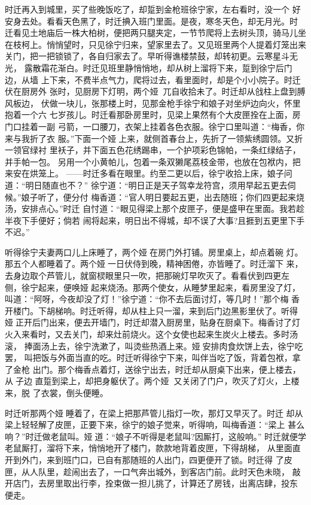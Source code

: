 时迁再入到城里，买了些晚饭吃了，却踅到金枪班徐宁家，左右看时，没一个
好安身去处。看看天色黑了，时迁捵入班门里面。是夜，寒冬天色，却无月光。时
迁看见土地庙后一株大柏树，便把两只腿夹定，一节节爬将上去树头顶，骑马儿坐
在枝柯上。悄悄望时，只见徐宁归来，望家里去了。又见班里两个人提着灯笼出来
关门，把一把锁锁了，各自归家去了。早听得谯楼禁鼓，却转初更。云寒星斗无光，
露散霜花渐白。时迁见班里静悄悄地，却从树上溜将下来，踅到徐宁后门边，从墙
上下来，不费半点气力，爬将过去，看里面时，却是个小小院子。时迁伏在厨房外
张时，见厨房下灯明，两个娅，兀自收拾未了。时迁却从戗柱上盘到膊风板边，
伏做一块儿，张那楼上时，见那金枪手徐宁和娘子对坐炉边向火，怀里抱着一个六
七岁孩儿。时迁看那卧房里时，见梁上果然有个大皮匣拴在上面，房门口挂着一副
弓箭，一口腰刀，衣架上挂着各色衣服。徐宁口里叫道：“梅香，你来与我折了衣
服。”下面一个娅上来，就侧首春台上，先折了一领紫绣圆领。又折一领官绿衬
里袄子，并下面五色花绣踢串，一个护项彩色锦帕，一条红绿结子，并手帕一包。
另用一个小黄帕儿，包着一条双獭尾荔枝金带，也放在包袱内，把来安在烘笼上。
——时迁多看在眼里。约至二更以后，徐宁收拾上床，娘子问道：“明日随直也不？”
徐宁道：“明日正是天子驾幸龙符宫，须用早起五更去伺候。”娘子听了，便分付
梅香道：“官人明日要起五更，出去随班；你们四更起来烧汤，安排点心。”时迁
自忖道：“眼见得梁上那个皮匣子，便是盛甲在里面。我若趁半夜下手便好；倘若
闹将起来，明日出不得城，却不误了大事?且捱到五更里下手不迟。”

听得徐宁夫妻两口儿上床睡了，两个娅在房门外打铺。房里桌上，却点着碗
灯。那五个人都睡着了。两个娅一日伏侍到晚，精神困倦，亦皆睡了。时迁溜下
来，去身边取个芦管儿，就窗棂眼里只一吹，把那碗灯早吹灭了。看看伏到四更左
侧，徐宁起来，便唤娅起来烧汤。那两个使女，从睡梦里起来，看房里没了灯，
叫道：“阿呀，今夜却没了灯！”徐宁道：“你不去后面讨灯，等几时！”那个梅
香开楼门。下胡梯响。时迁听得，却从柱上只一溜，来到后门边黑影里伏了。听得
娅正开后门出来，便去开墙门，时迁却潜入厨房里，贴身在厨桌下。梅香讨了灯
火入来看时，又去关门，却来灶前烧火。这个女使也起来生炭火上楼去。多时汤滚，
捧面汤上去，徐宁洗漱了，叫烫些热酒上来。娅安排肉食炊饼上去，徐宁吃罢，
叫把饭与外面当直的吃。时迁听得徐宁下来，叫伴当吃了饭，背着包袱，拿了金枪
出门。那个梅香点着灯，送徐宁出去，时迁却从厨桌下出来，便上楼去，从子边
直踅到梁上，却把身躯伏了。两个娅，又关闭了门户，吹灭了灯火，上楼来，脱
了衣裳，倒头便睡。

时迁听那两个娅睡着了，在梁上把那芦管儿指灯一吹，那灯又早灭了。时迁
却从梁上轻轻解了皮匣，正要下来，徐宁的娘子觉来，听得响，叫梅香道：“梁上
甚么响？”时迁做老鼠叫。娅道：“娘子不听得是老鼠叫?因厮打，这般响。”
时迁就便学老鼠厮打，溜将下来，悄悄地开了楼门，款款地背着皮匣，下得胡梯，
从里面直开到外门，来到班门口，已自有那随班的人出门，四更便开了锁。时迁得
了皮匣，从人队里，趁闹出去了，一口气奔出城外，到客店门前。此时天色未晓，
敲开店门，去房里取出行李，拴束做一担儿挑了，计算还了房钱，出离店肆，投东
便走。

